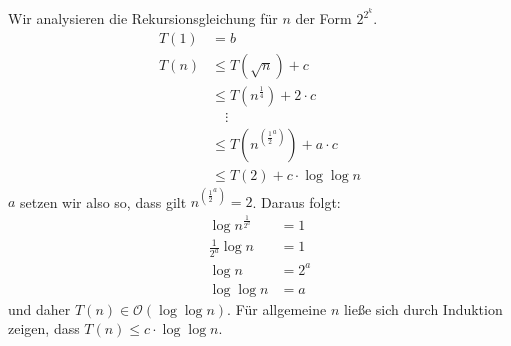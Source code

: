 \begin{Lza}
Wir analysieren die Rekursionsgleichung für $n$ der Form $2^{2^k}$.
\begin{align*}
  T(1) &=b \\
  T(n) &\le T(\sqrt{n}) + c \\
       &\le T(n^{\frac{1}{4}}) +2 \cdot c \\
       &\quad\vdots \\
       &\le T(n^{(\frac{1}{2}^a)}) + a \cdot c \\
       &\le T(2) + c \cdot \log \log n
\end{align*}
$a$ setzen wir also so, dass gilt $n^{\left(\frac{1}{2}^a\right)} = 2$. Daraus folgt:
\begin{align*}
  \log n^{\frac{1}{2^a}} &= 1 \\
  \frac{1}{2^a} \log n &= 1\\
  \log n &= 2^a\\
  \log \log n &= a
\end{align*}
und daher $ T(n) \in \mathcal{O}(\log \log n)$. Für allgemeine $n$ ließe sich durch Induktion zeigen, dass $T(n) \le c \cdot \log \log n$.
\end{Lza}
